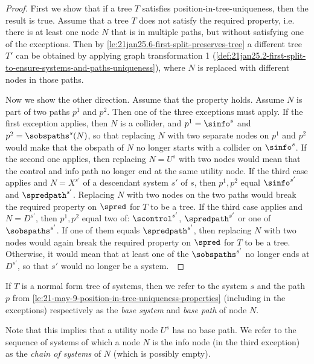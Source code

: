 \begin{proof}
First we show that if a tree $T$ satisfies position-in-tree-uniqueness, then the result is true. Assume that a tree $T$ does not satisfy the required property, i.e. there is at least one node $N$ that is in multiple paths, but without satisfying one of the exceptions. Then by \cref{le:21jan25.6-first-split-preserves-tree} a different tree $T'$ can be obtained by applying graph transformation 1 (\cref{def:21jan25.2-first-split-to-ensure-systems-and-paths-uniqueness}), where $N$ is replaced with different nodes in those paths.~

Now we show the other direction. Assume that the property holds.
Assume $N$ is part of two paths $p^1$ and $p^2$. Then one of the three exceptions must apply. If the first exception applies, then $N$ is a collider, and $p^1=\sinfo^s$ and $p^2=\sobspaths^s(N)$, so that replacing $N$ with two separate nodes on $p^1$ and $p^2$ would make that the obspath of $N$ no longer starts with a collider on $\sinfo^s$. If the second one applies, then replacing $N=U^s$ with two nodes would mean that the control and info path no longer end at the same utility node. If the third case applies and $N=X^{s'}$ of a  descendant system $s'$ of $s$, then $p^1, p^2$ equal $\sinfo^{s'}$ and $\spredpath^{s'}$. Replacing $N$ with two nodes on the two paths would break the required property on $\spred$ for $T$ to be a tree. If the third case applies and $N=D^{s'}$, then $p^1,p^2$ equal two of: $\scontrol^{s'}$, $\spredpath^{s'}$ or one of $\sobspaths^{s'}$. If one of them equals $\spredpath^{s'}$, then replacing $N$ with two nodes would again break the required property on $\spred$ for $T$ to be a tree. Otherwise, it would mean that at least one of the $\sobspaths^{s'}$ no longer ends at $D^{s'}$, so that $s'$ would no longer be a system.~
\end{proof}




\begin{definition}  \label{def:21feb17.2-base-sytem-and-path-of-node}
If $T$ is a normal form tree of systems, then we refer to the system $s$ and the path $p$ from
\cref{le:21-may-9-position-in-tree-uniqueness-properties}
(including in the exceptions) respectively as the \emph{base system} and \emph{base path} of node $N$. 
\end{definition}
Note that this implies that a utility node $U^s$ has no base path. We refer to the sequence of systems of which a node $N$ is the info node (in the third exception) as the \emph{chain of systems} of $N$ (which is possibly empty).

